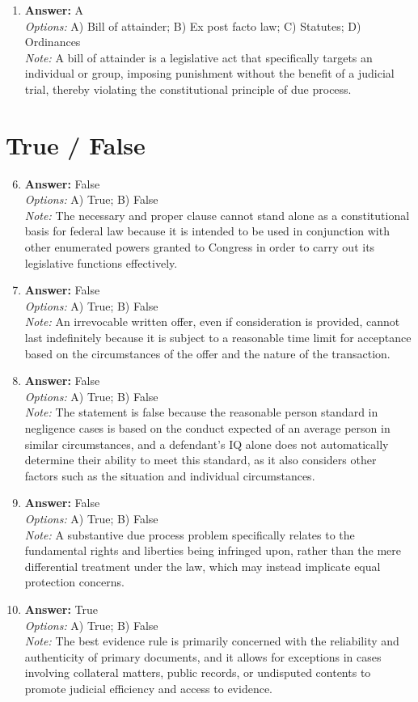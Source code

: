 \documentclass[12pt]{article}
\begin{document}
\begin{enumerate}[label=\arabic*.]
\item \textbf{Answer:} A
\\ \textit{Options:} A) Bill of attainder; B) Ex post facto law; C) Statutes; D) Ordinances
\\ \textit{Note:} A bill of attainder is a legislative act that specifically targets an individual or group, imposing punishment without the benefit of a judicial trial, thereby violating the constitutional principle of due process.
\end{enumerate}

\section*{True / False}
\begin{enumerate}[label=\arabic*.]
\setcounter{enumi}{5}
\item \textbf{Answer:} False
\\ \textit{Options:} A) True; B) False
\\ \textit{Note:} The necessary and proper clause cannot stand alone as a constitutional basis for federal law because it is intended to be used in conjunction with other enumerated powers granted to Congress in order to carry out its legislative functions effectively.
\item \textbf{Answer:} False
\\ \textit{Options:} A) True; B) False
\\ \textit{Note:} An irrevocable written offer, even if consideration is provided, cannot last indefinitely because it is subject to a reasonable time limit for acceptance based on the circumstances of the offer and the nature of the transaction.
\item \textbf{Answer:} False
\\ \textit{Options:} A) True; B) False
\\ \textit{Note:} The statement is false because the reasonable person standard in negligence cases is based on the conduct expected of an average person in similar circumstances, and a defendant's IQ alone does not automatically determine their ability to meet this standard, as it also considers other factors such as the situation and individual circumstances.
\item \textbf{Answer:} False
\\ \textit{Options:} A) True; B) False
\\ \textit{Note:} A substantive due process problem specifically relates to the fundamental rights and liberties being infringed upon, rather than the mere differential treatment under the law, which may instead implicate equal protection concerns.
\item \textbf{Answer:} True
\\ \textit{Options:} A) True; B) False
\\ \textit{Note:} The best evidence rule is primarily concerned with the reliability and authenticity of primary documents, and it allows for exceptions in cases involving collateral matters, public records, or undisputed contents to promote judicial efficiency and access to evidence.
\end{enumerate}
\end{document}
